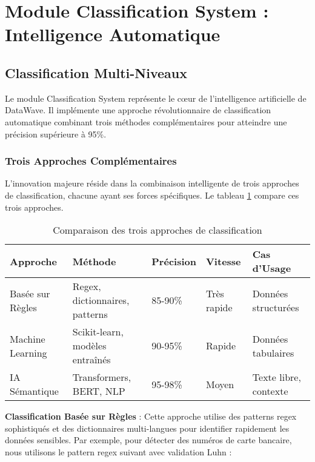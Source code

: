 
\section{Module Classification System : Intelligence Automatique}

\subsection{Classification Multi-Niveaux}

Le module Classification System représente le cœur de l'intelligence artificielle de DataWave. Il implémente une approche révolutionnaire de classification automatique combinant trois méthodes complémentaires pour atteindre une précision supérieure à 95\%.

\subsubsection{Trois Approches Complémentaires}

L'innovation majeure réside dans la combinaison intelligente de trois approches de classification, chacune ayant ses forces spécifiques. Le tableau \ref{tab:approches_classification} compare ces trois approches.

\begin{table}[htpb]
\centering
\caption{Comparaison des trois approches de classification}
\label{tab:approches_classification}
\begin{tabular}{|p{}|p{}|p{}|p{}|p{}|}
\hline
\textbf{Approche} & \textbf{Méthode} & \textbf{Précision} & \textbf{Vitesse} & \textbf{Cas d'Usage} \\
\hline
Basée sur Règles & Regex, dictionnaires, patterns & 85-90\% & Très rapide & Données structurées \\
\hline
Machine Learning & Scikit-learn, modèles entraînés & 90-95\% & Rapide & Données tabulaires \\
\hline
IA Sémantique & Transformers, BERT, NLP & 95-98\% & Moyen & Texte libre, contexte \\
\hline
\end{tabular}
\end{table}

\textbf{Classification Basée sur Règles} : Cette approche utilise des patterns regex sophistiqués et des dictionnaires multi-langues pour identifier rapidement les données sensibles. Par exemple, pour détecter des numéros de carte bancaire, nous utilisons le pattern regex suivant avec validation Luhn :

